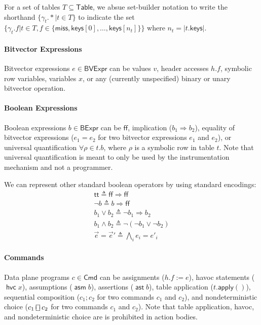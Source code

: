 \documentclass{article}
\newcommand{\TRUE}{\mathsf{tt}}
\newcommand{\FALSE}{\mathsf{ff}}
\newcommand{\BVExpr}{\mathsf{BVExpr}}
\newcommand{\BExpr}{\mathsf{BExpr}}
\newcommand{\Table}{\mathsf{Table}}
\newcommand{\keys}{\mathsf{keys}}
\newcommand{\miss}{\mathsf{miss}}
\newcommand{\assert}{\mathop{\mathsf{ast}}}
\newcommand{\assume}{\mathop{\mathsf{asm}}}
\newcommand{\apply}{\mathsf{apply}}
\newcommand{\choiceop}{\rotatebox[origin=c]{90}{$\sqsubset\!\!\!\sqsupset$}}
\newcommand{\choice}{\mathbin{\choiceop}}
\newcommand{\havoc}[1]{\mathop{\mathsf{hvc}}#1}
\theoremstyle{plain}
\theoremstyle{definition}
\theoremstyle{remark}
\begin{document}
For a set of tables $T \subseteq \Table$, we absue set-builder notation to write
the shorthand $\{\gamma_t.*| t \in T \}$ to indicate the set $\{\gamma_t.f | t \in
T, f \in \{\miss, \keys[0], \ldots, \keys[n_t]\}\}$ where $n_t = |t.\keys|$.

\paragraph{Bitvector Expressions}
Bitvector expressions $e \in \BVExpr$ can be values $v$, header accesses $h.f$,
symbolic row variables, variables $x$, or any
(currently unspecified) binary or unary bitvector operation.

\paragraph{Boolean Expressions}
Boolean expressions $b \in \BExpr$ can be $\FALSE$, implication ($b_1
\Rightarrow b_2$), equality of bitvector expressions ($e_1 = e_2$ for two
bitvector expressions $e_1$ and $e_2$), or universal quantification $\forall
\rho \in t. b$, where $\rho$ is a symbolic row in table $t$. Note that universal
quantification is meant to only be used by the instrumentation mechanism and not
a programmer.

We can represent other standard boolean operators by using standard encodings:
\[\begin{array}{l}
  \TRUE \triangleq \FALSE \Rightarrow \FALSE \\
  \neg b \triangleq b \Rightarrow \FALSE \\
  b_1 \vee b_2 \triangleq \neg b_1 \Rightarrow b_2 \\
  b_1 \wedge b_2 \triangleq \neg(\neg b_1 \vee \neg b_2) \\
  \vec e = \vec e' \triangleq \bigwedge_i e_i = e'_i
\end{array}\]

\paragraph{Commands}
Data plane programs $c \in \mathsf{Cmd}$ can be assignments ($h.f := e$), havoc
statements ($\havoc x$), assumptions ($\assume b$), assertions ($\assert b$),
table application ($t.\apply()$), sequential composition ($c_1;c_2$ for two
commands $c_1$ and $c_2$), and nondeterministic choice ($c_1 \choice c_2$ for
two commands $c_1$ and $c_2$). Note that table application, havoc, and
nondeterministic choice are is prohibited in action bodies.
\end{document}
